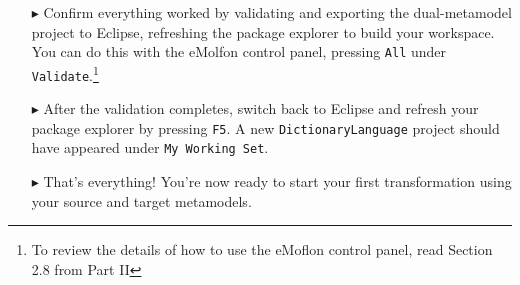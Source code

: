 \begin{itemize}
\clearpage

\item[$\blacktriangleright$] Confirm everything worked by validating and exporting the dual-metamodel project to Eclipse, refreshing the package explorer to
build your workspace. You can do this with the eMolfon control panel, pressing \texttt{All} under \texttt{Validate}.\footnote{To review the details of how to
use the eMoflon control panel, read Section 2.8 from Part II}

\item[$\blacktriangleright$] After the validation completes, switch back to Eclipse and refresh your package explorer by pressing \texttt{F5}. A new
\texttt{DictionaryLanguage} project should have appeared under \texttt{My Working Set}.

\item[$\blacktriangleright$] That's everything! You're now ready to start your first transformation using your source and target metamodels.


\end{itemize}
